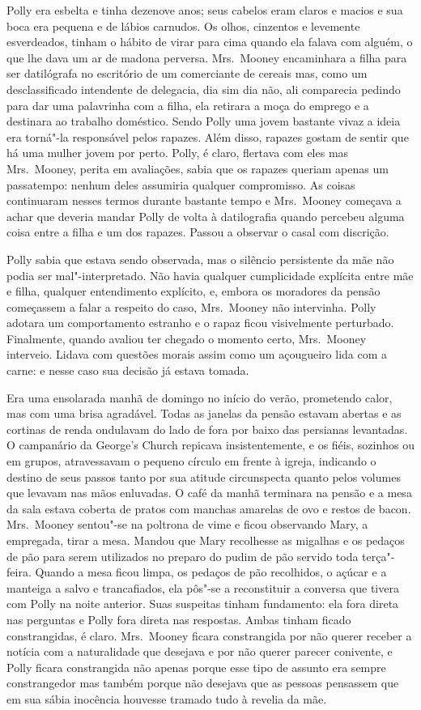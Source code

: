 Polly era esbelta e tinha dezenove anos; seus cabelos eram claros e macios e
sua boca era pequena e de lábios carnudos.  Os olhos, cinzentos e levemente
esverdeados, tinham o hábito de virar para cima quando ela falava com alguém, o
que lhe dava um ar de madona perversa.  Mrs.~Mooney encaminhara a filha para
ser datilógrafa no escritório de um comerciante de cereais mas, como um
desclassificado intendente de delegacia, dia sim dia não, ali comparecia
pedindo para dar uma palavrinha com a filha, ela retirara a moça do emprego e a
destinara ao trabalho doméstico.  Sendo Polly uma jovem bastante vivaz a ideia
era torná"-la responsável pelos rapazes.  Além disso, rapazes gostam de sentir
que há uma mulher jovem por perto.  Polly, é claro, flertava com eles mas 
Mrs.~Mooney, perita em avaliações, sabia que os rapazes queriam apenas um
passatempo: nenhum deles assumiria qualquer compromisso.  As coisas continuaram
nesses termos durante bastante tempo e Mrs.~Mooney começava a achar que deveria
mandar Polly de volta à datilografia quando percebeu alguma coisa entre a filha
e um dos rapazes.  Passou a observar o casal com discrição.

Polly sabia que estava sendo observada, mas o silêncio persistente da mãe não
podia ser mal"-interpretado.  Não havia qualquer cumplicidade explícita entre
mãe e filha, qualquer entendimento explícito, e, embora os moradores da pensão
começassem a falar a respeito do caso, Mrs.~Mooney não intervinha.  Polly
adotara um comportamento estranho e o rapaz ficou visivelmente perturbado.
Finalmente, quando avaliou ter chegado o momento certo, Mrs.~Mooney interveio.
Lidava com questões morais assim como um açougueiro lida com a carne: e nesse
caso sua decisão já estava tomada.

Era uma ensolarada manhã de domingo no início do verão, prometendo calor, mas
com uma brisa agradável.  Todas as janelas da pensão estavam abertas e as
cortinas de renda ondulavam do lado de fora por baixo das persianas levantadas.
O campanário da George’s Church repicava insistentemente, e os fiéis, sozinhos
ou em grupos, atravessavam o pequeno círculo em frente à igreja, indicando o
destino de seus passos tanto por sua atitude circunspecta quanto pelos volumes
que levavam nas mãos enluvadas.  O café da manhã terminara na pensão e a mesa
da sala estava coberta de pratos com manchas amarelas de ovo e restos de bacon.
Mrs.~Mooney sentou"-se na poltrona de vime e ficou observando Mary, a empregada,
tirar a mesa.  Mandou que Mary recolhesse as migalhas e os pedaços de pão para
serem utilizados no preparo do pudim de pão servido toda terça"-feira.  Quando a
mesa ficou limpa, os pedaços de pão recolhidos, o açúcar e a manteiga a salvo e
trancafiados, ela pôs"-se a reconstituir a conversa que tivera com Polly na
noite anterior.  Suas suspeitas tinham fundamento: ela fora direta nas
perguntas e Polly fora direta nas respostas.  Ambas tinham ficado
constrangidas, é claro.  Mrs.~Mooney ficara constrangida por não querer receber
a notícia com a naturalidade que desejava e por não querer parecer conivente, e
Polly ficara constrangida não apenas porque esse tipo de assunto era sempre
constrangedor mas também porque não desejava que as pessoas pensassem que em
sua sábia inocência houvesse tramado tudo à revelia da mãe.

